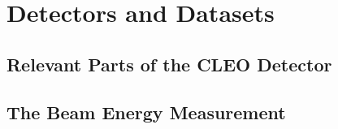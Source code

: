 \documentclass[aps,prd,preprint,superscriptaddress,tightenlines,nofootinbib,floatfix]{revtex4}
\begin{document}

%
\section{Detectors and Datasets}
%

%
\subsection{Relevant Parts of the CLEO Detector}
%


%
\subsection{The Beam Energy Measurement}
%

\end{document}

